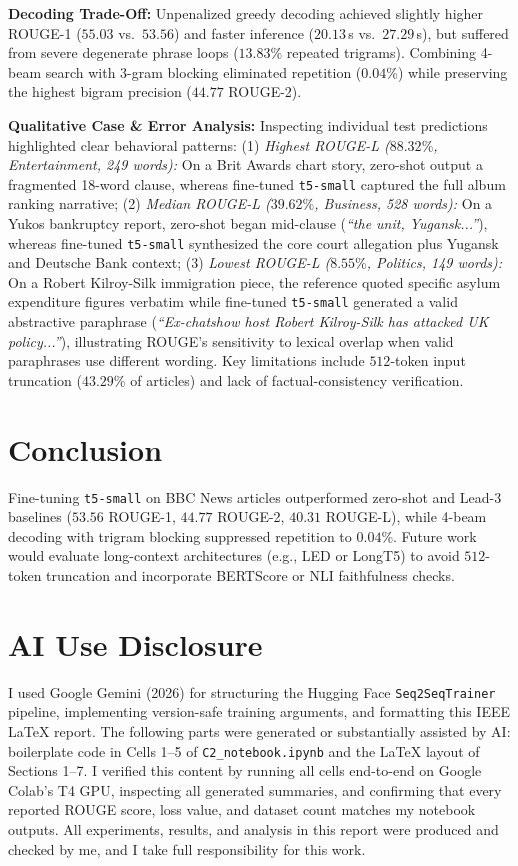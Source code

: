 \documentclass[conference,a4paper]{IEEEtran}
\begin{document}
\textbf{Decoding Trade-Off:} Unpenalized greedy decoding achieved slightly higher ROUGE-1 ($55.03$ vs.\ $53.56$) and faster inference ($20.13$\,s vs.\ $27.29$\,s), but suffered from severe degenerate phrase loops ($13.83\%$ repeated trigrams). Combining 4-beam search with 3-gram blocking eliminated repetition ($0.04\%$) while preserving the highest bigram precision ($44.77$ ROUGE-2).

\textbf{Qualitative Case & Error Analysis:} Inspecting individual test predictions highlighted clear behavioral patterns: (1) \textit{Highest ROUGE-L ($88.32\%$, Entertainment, 249 words):} On a Brit Awards chart story, zero-shot output a fragmented 18-word clause, whereas fine-tuned \texttt{t5-small} captured the full album ranking narrative; (2) \textit{Median ROUGE-L ($39.62\%$, Business, 528 words):} On a Yukos bankruptcy report, zero-shot began mid-clause (\textit{``the unit, Yugansk...''}), whereas fine-tuned \texttt{t5-small} synthesized the core court allegation plus Yugansk and Deutsche Bank context; (3) \textit{Lowest ROUGE-L ($8.55\%$, Politics, 149 words):} On a Robert Kilroy-Silk immigration piece, the reference quoted specific asylum expenditure figures verbatim while fine-tuned \texttt{t5-small} generated a valid abstractive paraphrase (\textit{``Ex-chatshow host Robert Kilroy-Silk has attacked UK policy...''}), illustrating ROUGE's sensitivity to lexical overlap when valid paraphrases use different wording. Key limitations include $512$-token input truncation ($43.29\%$ of articles) and lack of factual-consistency verification.

\section{Conclusion}
Fine-tuning \texttt{t5-small} on BBC News articles outperformed zero-shot and Lead-3 baselines ($53.56$ ROUGE-1, $44.77$ ROUGE-2, $40.31$ ROUGE-L), while 4-beam decoding with trigram blocking suppressed repetition to $0.04\%$. Future work would evaluate long-context architectures (e.g., LED or LongT5) to avoid $512$-token truncation and incorporate BERTScore or NLI faithfulness checks.

\section*{AI Use Disclosure}
I used Google Gemini (2026) for structuring the Hugging Face \texttt{Seq2SeqTrainer} pipeline, implementing version-safe training arguments, and formatting this IEEE LaTeX report. The following parts were generated or substantially assisted by AI: boilerplate code in Cells 1--5 of \texttt{C2\_notebook.ipynb} and the LaTeX layout of Sections 1--7. I verified this content by running all cells end-to-end on Google Colab's T4 GPU, inspecting all generated summaries, and confirming that every reported ROUGE score, loss value, and dataset count matches my notebook outputs. All experiments, results, and analysis in this report were produced and checked by me, and I take full responsibility for this work.
\end{document}
